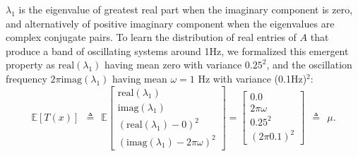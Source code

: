 \documentclass[11pt]{article}
\begin{document}
 $\lambda_1$ is the eigenvalue of greatest real part when the imaginary component is zero, and alternatively of positive imaginary component when the eigenvalues are complex conjugate pairs.  
To learn the distribution of real entries of $A$ that produce a band of oscillating systems around 1Hz, we formalized this emergent property as $\text{real}(\lambda_1)$ having mean zero with variance $0.25^2$, and the oscillation frequency $2 \pi \text{imag}(\lambda_1)$ having mean $\omega = 1$ Hz with variance (0.1Hz)$^2$:
\begin{equation}
 \mathbb{E}\left[T(x) \right] ~~ \triangleq ~~ \mathbb{E} \begin{bmatrix} \text{real}(\lambda_1) \\ \text{imag}(\lambda_1) \\ (\text{real}(\lambda_1)-0)^2  \\ (\text{imag}(\lambda_1)-2 \pi \omega)^2 \end{bmatrix} = \begin{bmatrix} 0.0 \\ 2 \pi \omega \\ 0.25^2 \\ (2 \pi 0.1)^2 \end{bmatrix} ~~ \triangleq ~~ \mu.
 \end{equation} 
\end{document}

